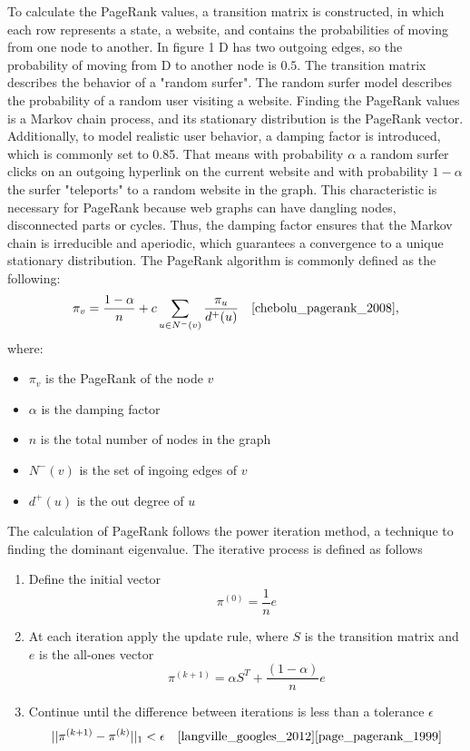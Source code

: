 To calculate the PageRank values, a transition matrix is constructed, in which each row represents a state, a website, and contains the probabilities of moving from one node to another. In figure 1 D has two outgoing edges, so the probability of moving from D to another node is $0.5$. The transition matrix describes the behavior of a "random surfer". The random surfer model describes the probability of a random user visiting a website. Finding the PageRank values is a Markov chain process, and its stationary distribution is the PageRank vector. Additionally, to model realistic user behavior, a damping factor is introduced, which is commonly set to 0.85. That means with probability $\alpha$ a random surfer clicks on an outgoing hyperlink on the current website and with probability $1-\alpha$ the surfer "teleports" to a random website in the graph. This characteristic is necessary for PageRank because web graphs can have dangling nodes, disconnected parts or cycles. Thus, the damping factor ensures that the Markov chain is irreducible and aperiodic, which guarantees a convergence to a unique stationary distribution. 
The PageRank algorithm is commonly defined as the following:
\begin{equation}
    \pi_v = \frac{1-\alpha}{n}+c\sum_{u\in N^-(v)}\frac{\pi_u}{d^+(u)} \quad\text{\cite{chebolu_pagerank_2008},}
\end{equation} 
where: 
\begin{itemize}
    \item $\pi_v$ is the PageRank of the node $v$
    \item $\alpha$ is the damping factor
    \item $n$ is the total number of nodes in the graph
    \item $N^-(v)$ is the set of ingoing edges of $v$
    \item $d^+(u)$ is the out degree of $u$
\end{itemize} 
The calculation of PageRank follows the power iteration method, a technique to finding the dominant eigenvalue. The iterative process is defined as follows
\begin{enumerate}
    \item Define the initial vector 
    \begin{equation}
        \pi^{(0)}=\frac{1}{n}e
    \end{equation}
    \item At each iteration apply the update rule, where $S$ is the transition matrix and $e$ is the all-ones vector
    \begin{equation}
        \pi^{(k+1)} = \alpha S^T+ \frac{(1-\alpha)}{n}e
    \end{equation}
    \item Continue until the difference between iterations is less than a tolerance $\epsilon$
    \begin{equation}
        ||\pi^{(k+1)}-\pi^{(k)}||_1<\epsilon \quad \text{\cite{langville_googles_2012}\cite{page_pagerank_1999}}
    \end{equation}
    
\end{enumerate}
